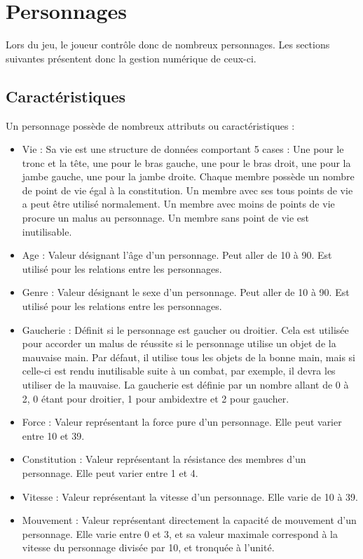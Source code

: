 \section{Personnages}
Lors du jeu, le joueur contrôle donc de nombreux personnages. Les sections suivantes présentent donc la gestion numérique de ceux-ci.
\subsection{Caractéristiques}
Un personnage possède de nombreux attributs ou caractéristiques :
\begin{itemize}
  \item Vie : Sa vie est une structure de données comportant 5 cases : Une pour le tronc et la tête, une pour le bras gauche, une pour le bras droit, une pour la jambe gauche, une pour la jambe droite. Chaque membre possède un nombre de point de vie égal à la constitution. Un membre avec ses tous points de vie a peut être utilisé normalement. Un membre avec moins de points de vie procure un malus au personnage. Un membre sans point de vie est inutilisable.
  \item Age : Valeur désignant l'âge d'un personnage. Peut aller de 10 à 90. Est utilisé pour les relations entre les personnages.
  \item Genre : Valeur désignant le sexe d'un personnage. Peut aller de 10 à 90. Est utilisé pour les relations entre les personnages.
  \item Gaucherie : Définit si le personnage est gaucher ou droitier. Cela est utilisée pour accorder un malus de réussite si le personnage utilise un objet de la mauvaise main. Par défaut, il utilise tous les objets de la bonne main, mais si celle-ci est rendu inutilisable suite à un combat, par exemple, il devra les utiliser de la mauvaise. La gaucherie est définie par un nombre allant de 0 à 2, 0 étant pour droitier, 1 pour ambidextre et 2 pour gaucher.
  \item Force : Valeur représentant la force pure d'un personnage. Elle peut varier entre 10 et 39.
  \item Constitution : Valeur représentant la résistance des membres d'un personnage. Elle peut varier entre 1 et 4.
  \item Vitesse : Valeur représentant la vitesse d'un personnage. Elle varie de 10 à 39.
  \item Mouvement : Valeur représentant directement la capacité de mouvement d'un personnage. Elle varie entre 0 et 3, et sa valeur maximale correspond à la vitesse du personnage divisée par 10, et tronquée à l'unité.

\end{itemize}
